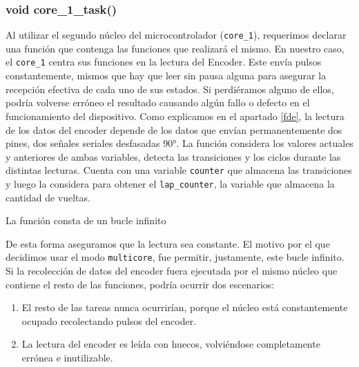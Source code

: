 \begin{enumerate}
\begin{enumerate}
                        \end{enumerate}
                    \end{enumerate}

                \subsubsection{void core\_1\_task()}
                    Al utilizar el segundo núcleo del microcontrolador (\texttt{core\_1}), requerimos declarar una función que contenga las funciones que realizará el mismo. En nuestro caso, el \texttt{core\_1} centra sus funciones en la lectura del Encoder. Este envía pulsos constantemente, mismos que hay que leer sin pausa alguna para asegurar la recepción efectiva de cada uno de sus estados. Si perdiéramos alguno de ellos, podría volverse erróneo el resultado causando algún fallo o defecto en el funcionamiento del dispositivo.
                    Como explicamos en el apartado \ref{fde}, la lectura de los datos del encoder depende de los datos que envían permanentemente dos pines, dos señales seriales desfasadas 90°. La función considera los valores actuales y anteriores de ambas variables, detecta las transiciones y los ciclos durante las distintas lecturas. Cuenta con una variable \texttt{counter} que almacena las transiciones y luego la considera para obtener el \texttt{lap\_counter}, la variable que almacena la cantidad de vueltas.\par
                    La función consta de un bucle infinito\par
                    
                    
                    
                    De esta forma aseguramos que la lectura sea constante. El motivo por el que decidimos usar el modo \texttt{multicore}, fue permitir, justamente, este bucle infinito. Si la recolección de datos del encoder fuera ejecutada por el mismo núcleo que contiene el resto de las funciones, podría ocurrir dos escenarios:\par
                    \begin{enumerate}
                    \setlength{\itemindent}{1.5em}
                    
                        \item El resto de las tareas nunca ocurrirían, porque el núcleo está constantemente ocupado recolectando pulsos del encoder.
                        \item La lectura del encoder es leída con huecos, volviéndose completamente errónea e inutilizable.
                    \end{enumerate}
                    
